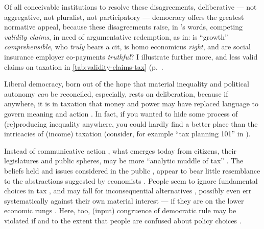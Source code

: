 Of all conceivable institutions to resolve these disagreements, deliberative --- not aggregative, not pluralist, not participatory --- democracy offers the greatest normative appeal, because these disagreements raise, in \citeauthor{Habermas-1984}'s words, competing \emph{validity claims}, in need of argumentative redemption, as in:
is ``growth'' \emph{comprehensible}, who \emph{truly} bears a \gls{cit}, is homo economicus \emph{right}, and are social insurance employer co-payments \emph{truthful}?
I illustrate further more, and less valid claims on taxation in \autoref{tab:validity-claims-tax} (p.~\pageref{tab:validity-claims-tax}.



Liberal democracy, born out of the hope that material inequality and political autonomy \emph{can} be reconciled, %
especially, rests on deliberation, because if anywhere, it is in taxation that money and power may have replaced language to govern meaning and action \citep{Habermas-1971}.
In fact, if you wanted to hide some process of (re)producing inequality anywhere, you could hardly find a better place than the intricacies of (income) taxation (consider, for example ``tax planning 101'' in \citealt[888]{McCaffery2005}).

Instead of communicative action \citep{Habermas-1984}, what emerges today from citizens, their legislatures and public spheres, may be more ``analytic muddle of tax'' \citep[862]{McCaffery2005}.
The beliefs held and issues considered in the public \citep[for example,][]{Caplan2007}, appear to bear little resemblance to the abstractions suggested by economists \cite[for example,][]{Harberger1974}.
People seem to ignore fundamental choices in tax \citep[for example,][]{McCafferyHines2010}, and may fall for inconsequential alternatives \citep[for example,][]{SausgruberTyran2011}, possibly even err systematically against their own material interest --- if they are on the lower economic rungs \citep[for a German example,][]{Kemmerling2009}.
Here, too, (input) congruence of democratic rule may be violated if and to the extent that people are confused about policy choices \citep[compare][90]{Zurn-2000-aa}.


